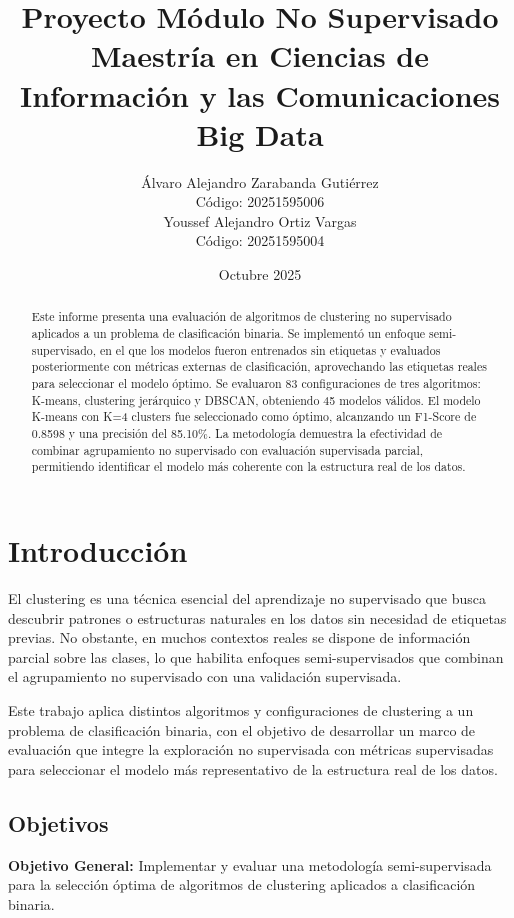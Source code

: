 \documentclass[12pt,a4paper]{article}
\title{Proyecto Módulo No Supervisado\\
\large Maestría en Ciencias de Información y las Comunicaciones\\
\large Big Data}
\author{Álvaro Alejandro Zarabanda Gutiérrez\\Código: 20251595006\\Youssef Alejandro Ortiz Vargas\\Código: 20251595004}
\date{Octubre 2025}
\begin{document}
\maketitle

\begin{abstract}
Este informe presenta una evaluación de algoritmos de clustering no supervisado aplicados a un problema de clasificación binaria. Se implementó un enfoque semi-supervisado, en el que los modelos fueron entrenados sin etiquetas y evaluados posteriormente con métricas externas de clasificación, aprovechando las etiquetas reales para seleccionar el modelo óptimo. Se evaluaron 83 configuraciones de tres algoritmos: K-means, clustering jerárquico y DBSCAN, obteniendo 45 modelos válidos. El modelo K-means con K=4 clusters fue seleccionado como óptimo, alcanzando un F1-Score de 0.8598 y una precisión del 85.10\%. La metodología demuestra la efectividad de combinar agrupamiento no supervisado con evaluación supervisada parcial, permitiendo identificar el modelo más coherente con la estructura real de los datos.
\end{abstract}

\tableofcontents
\newpage

\section{Introducción}

El clustering es una técnica esencial del aprendizaje no supervisado que busca descubrir patrones o estructuras naturales en los datos sin necesidad de etiquetas previas.
No obstante, en muchos contextos reales se dispone de información parcial sobre las clases, lo que habilita enfoques semi-supervisados que combinan el agrupamiento no supervisado con una validación supervisada.

Este trabajo aplica distintos algoritmos y configuraciones de clustering a un problema de clasificación binaria, con el objetivo de desarrollar un marco de evaluación que integre la exploración no supervisada con métricas supervisadas para seleccionar el modelo más representativo de la estructura real de los datos.

\subsection{Objetivos}

\textbf{Objetivo General:} Implementar y evaluar una metodología semi-supervisada para la selección óptima de algoritmos de clustering aplicados a clasificación binaria.
\end{document}
